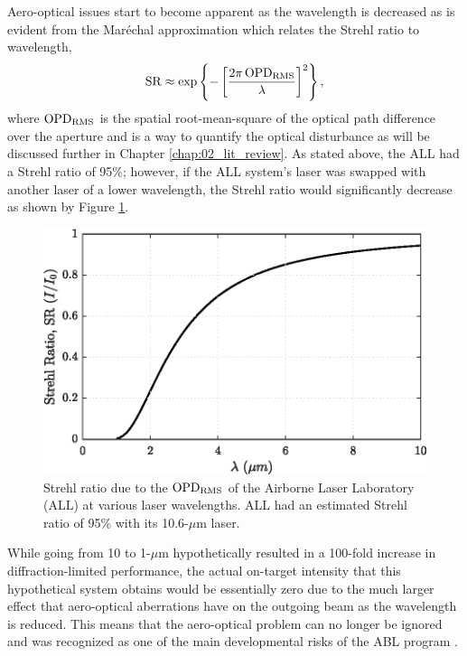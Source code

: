 Aero-optical issues start to become apparent as the wavelength is decreased as is evident from the Mar\'echal approximation \cite{Mahajan-1983-hg7ahvJM} which relates the Strehl ratio to wavelength,
\begin{equation}
  \operatorname{SR} \approx \exp\left\{-\left[\frac{2\pi \operatorname{OPD_{RMS}}}{\lambda}\right]^2\right\} \textrm{,}
  \label{eqn:01_strehl_ratio}
\end{equation}
where $\operatorname{OPD_{RMS}}$ is the spatial root-mean-square of the optical path difference over the aperture and is a way to quantify the optical disturbance as will be discussed further in Chapter \ref{chap:02_lit_review}.
As stated above, the ALL had a Strehl ratio of 95\%; however, if the ALL system's laser was swapped with another laser of a lower wavelength, the Strehl ratio would significantly decrease as shown by Figure \ref{fig:01_strehl_ratio}.
\begin{figure}
  \centering
  \includegraphics{../matlab/01_introduction/strehl_ratio.eps}
  \caption{Strehl ratio due to the $\operatorname{OPD_{RMS}}$ of the Airborne Laser Laboratory (ALL) at various laser wavelengths.  ALL had an estimated Strehl ratio of 95\% with its 10.6-$\mu$m laser.}
  \label{fig:01_strehl_ratio}
\end{figure}
While going from 10 to 1-$\mu$m hypothetically resulted in a 100-fold increase in diffraction-limited performance, the actual on-target intensity that this hypothetical system obtains would be essentially zero due to the much larger effect that aero-optical aberrations have on the outgoing beam as the wavelength is reduced.
This means that the aero-optical problem can no longer be ignored and was recognized as one of the main developmental risks of the ABL program \cite{DOTE-1999-HnkadUEw}.

